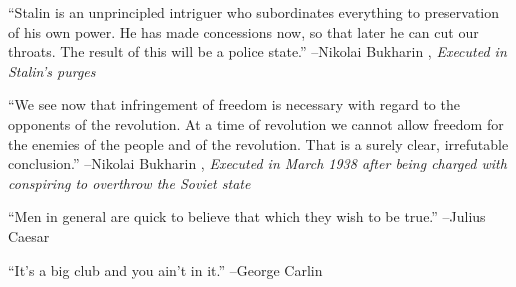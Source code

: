 \documentclass{article}%
\begin{document}
\linebreak%
\vspace{1mm}%
\begin{minipage}{\textwidth}%
\flushleft%
“Stalin is an unprincipled intriguer who subordinates everything to preservation  of his own power. He has made concessions now, so that later he can cut our throats.  The result of this will be a police state.”%
\linebreak%
\vspace{1mm}%
–Nikolai Bukharin%
, \textit{Executed in Stalin's purges}%
\linebreak%
\vspace{1mm}%
\end{minipage}%
\linebreak%
\vspace{1mm}%
\begin{minipage}{\textwidth}%
\flushleft%
“We see now that infringement of freedom is necessary with regard to the opponents of the revolution. At a time of revolution we cannot allow freedom for the enemies of the people and of the revolution. That is a surely clear, irrefutable conclusion.”%
\linebreak%
\vspace{1mm}%
–Nikolai Bukharin%
, \textit{Executed in March 1938 after being charged with conspiring to overthrow the Soviet state}%
\linebreak%
\vspace{1mm}%
\end{minipage}%
\linebreak%
\vspace{1mm}%
\begin{minipage}{\textwidth}%
\flushleft%
“Men in general are quick to believe that which they wish to be true.”%
\linebreak%
\vspace{1mm}%
–Julius Caesar%
\linebreak%
\vspace{1mm}%
\end{minipage}%
\linebreak%
\vspace{1mm}%
\begin{minipage}{\textwidth}%
\flushleft%
“It's a big club and you ain't in it.”%
\linebreak%
\vspace{1mm}%
–George Carlin%
\linebreak%
\vspace{1mm}%
\end{minipage}%
\end{document}
